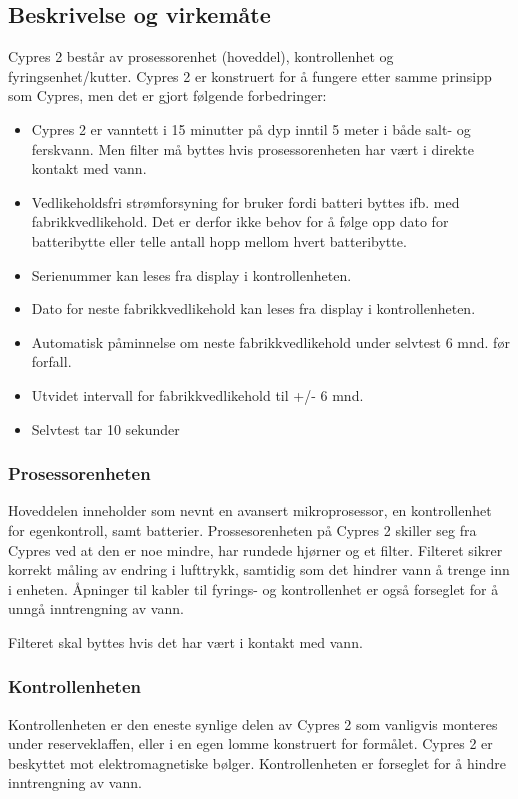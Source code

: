 \subsection{Beskrivelse og virkemåte}
Cypres 2 består av prosessorenhet (hoveddel), kontrollenhet og fyringsenhet/kutter. Cypres 2 er konstruert for å fungere etter samme prinsipp som Cypres, men det er gjort følgende forbedringer:
\begin{itemize}
\item Cypres 2 er vanntett i 15 minutter på dyp inntil 5 meter i både salt- og ferskvann. Men filter må byttes hvis prosessorenheten har vært i direkte kontakt med vann.
\item Vedlikeholdsfri strømforsyning for bruker fordi batteri byttes ifb. med fabrikkvedlikehold. Det er derfor ikke behov for å følge opp dato for batteribytte eller telle antall hopp mellom hvert batteribytte.
\item Serienummer kan leses fra display i kontrollenheten.
\item Dato for neste fabrikkvedlikehold kan leses fra display i kontrollenheten.
\item Automatisk påminnelse om neste fabrikkvedlikehold under selvtest 6 mnd. før forfall.
\item Utvidet intervall for fabrikkvedlikehold til +/- 6 mnd.
\item Selvtest tar 10 sekunder
\end{itemize}

\subsubsection{Prosessorenheten}
Hoveddelen inneholder som nevnt en avansert mikroprosessor, en kontrollenhet for egenkontroll, samt batterier. Prossesorenheten på Cypres 2 skiller seg fra Cypres ved at den er noe mindre, har rundede hjørner og et filter. Filteret sikrer korrekt måling av endring i lufttrykk, samtidig som det hindrer vann å trenge inn i enheten. Åpninger til kabler til fyrings- og kontrollenhet er også forseglet for å unngå inntrengning av vann.

Filteret skal byttes hvis det har vært i kontakt med vann.

\subsubsection{Kontrollenheten}
Kontrollenheten er den eneste synlige delen av Cypres 2 som vanligvis monteres under reserveklaffen, eller i en egen lomme konstruert for formålet. Cypres 2 er beskyttet mot elektromagnetiske bølger. Kontrollenheten er forseglet for å hindre inntrengning av vann.

